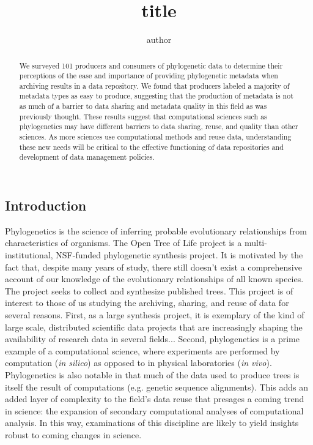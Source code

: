 \documentclass[12pt]{scrartcl}
\title{title}
\author{author}
\begin{document}
%
%

\maketitle
\thispagestyle{fancy}

\begin{multicols}{2}

\begin{abstract}
We surveyed 101 producers and consumers of phylogenetic data to determine their perceptions of the ease and importance of providing phylogenetic metadata when archiving results in a data repository.  We found that producers labeled a majority of metadata types as easy to produce, suggesting that the production of metadata is not as much of a barrier to data sharing and metadata quality in this field as was previously thought.  
These results suggest that computational sciences such as phylogenetics may have different barriers to data sharing, reuse, and quality than other sciences.  As more sciences use computational methods and reuse data, understanding these new needs will be critical to the effective functioning of data repositories and development of data management policies.
\end{abstract}


\section{Introduction}
Phylogenetics is the science of inferring probable evolutionary relationships from characteristics of organisms.  
The Open Tree of Life project %
is a multi-institutional, NSF-funded phylogenetic synthesis project.  It is motivated by the fact that, despite many years of study, there still doesn't exist a comprehensive account of our knowledge of the evolutionary relationships of all known species.  The project seeks to collect and synthesize published trees.
This project is of interest to those of us studying the archiving, sharing, and reuse of data for several reasons.  First, as a large synthesis project, it is exemplary of the kind of large scale, distributed scientific data projects that are increasingly shaping the availability of research data in several fields... %
Second, phylogenetics is a prime example of a computational science, where experiments are performed by computation (\textit{in silico}) as opposed to in physical laboratories (\textit{in vivo}).  Phylogenetics is also notable in that much of the data used to produce trees is itself the result of computations (e.g. genetic sequence alignments).  This adds an added layer of complexity to the field's data reuse that presages a coming trend in science: the expansion of secondary computational analyses of computational analysis.  In this way, examinations of this discipline are likely to yield insights robust to coming changes in science.


\end{multicols}
\end{document}

